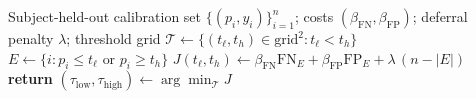 \begin{algorithm}[!t]
\caption{Cost-calibrated dual-threshold gate}
\label{alg:gate}
\begin{algorithmic}[1]
\REQUIRE Subject-held-out calibration set $\{(p_i,y_i)\}_{i=1}^{n}$; costs $(\beta_{\mathrm{FN}},\beta_{\mathrm{FP}})$; deferral penalty $\lambda$; threshold grid
\STATE $\mathcal{T}\leftarrow\{(t_\ell,t_h)\in \text{grid}^2 : t_\ell<t_h\}$
  \STATE $E\leftarrow\{i: p_i\le t_\ell \text{ or } p_i\ge t_h\}$ 
  \STATE $J(t_\ell,t_h)\leftarrow \beta_{\mathrm{FN}}\mathrm{FN}_{E}+\beta_{\mathrm{FP}}\mathrm{FP}_{E}+\lambda\,(n-|E|)$
\ENDFOR
\STATE \textbf{return} $(\tau_{\mathrm{low}},\tau_{\mathrm{high}})\leftarrow\arg\min_{\mathcal{T}} J$ 
\end{algorithmic}
\end{algorithm}
